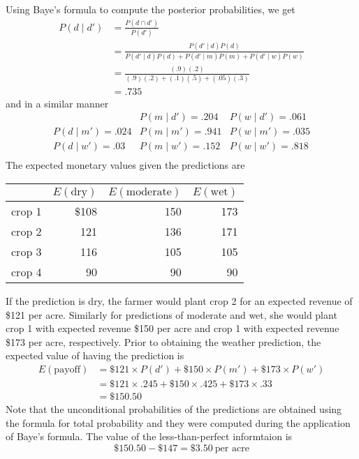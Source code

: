 \begin{enumerate}
\begin{solution}
Using Baye's formula to compute the posterior probabilities, we get
\begin{align*}
P(d \mid d') &= \frac{P(d \cap d')}{P(d')} \\
&= \frac{P(d' \mid d)P(d)}{P(d' \mid d)P(d) + P(d' \mid m)P(m) + P(d' \mid w)P(w)} \\
&= \frac{(.9)(.2)}{(.9)(.2) + (.1)(.5) + (.05)(.3)} \\
&= .735
\end{align*}
and in a similar manner 
\[
\begin{matrix}
& P(m \mid d')=.204 & P(w \mid d')=.061 \\
P(d \mid m')=.024 & P(m \mid m')=.941 & P(w \mid m')=.035 \\
P(d \mid w')=.03 & P(m \mid w')=.152 & P(w \mid w')=.818 \\
\end{matrix}
\]
The expected monetary values given the predictions are

\begin{center}
\begin{tabular}{lrrr}
& $E(\text{dry})$ & $E(\text{moderate})$ & $E(\text{wet})$ \\ \hline
crop 1 & \$108 & 150 & 173 \\
crop 2 & 121 & 136 & 171 \\
crop 3 & 116 & 105 & 105 \\
crop 4 & 90 & 90 & 90
\end{tabular}
\end{center}

If the prediction is dry, the farmer would plant crop 2 for an
expected revenue of \$121 per acre. Similarly for predictions
of moderate and wet, she would plant crop 1 with expected revenue
\$150 per acre and crop 1 with expected revenue \$173 per acre,
respectively. Prior to obtaining the weather prediction,
the expected value of having the prediction is 
\begin{align*}
E(\text{payoff}) &= \$121 \times P(d') + \$150 \times P(m') + \$173 \times P(w') \\
&= \$121 \times .245 + \$150 \times .425 + \$173 \times .33 \\
&= \$150.50
\end{align*}
Note that the unconditional probabilities of the predictions are obtained
using the formula for total probability and they were computed during the
application of Baye's formula. The value of the less-than-perfect
informtaion is 
\[
\$150.50 - \$147 = \$3.50~\text{per acre}
\]
\end{solution}


\end{enumerate}

